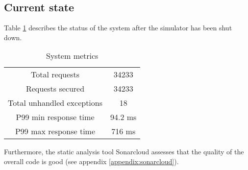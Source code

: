 \subsection{Current state}
Table \ref{current-table} describes the status of the system after the simulator has been shut down.
\begin{table}[H]
    \begin{center}
        \begin{tabular}{ |c|c| }
            \hline
            Total requests & 34233 \\
            Requests secured & 34233 \\
            Total unhandled exceptions & 18 \\
            P99 min response time & 94.2 ms \\
            P99 max response time & 716 ms \\
            \hline
        \end{tabular}
    \end{center}
    \caption{System metrics}
    \label{current-table}
\end{table}
Furthermore, the static analysis tool Sonarcloud assesses that the quality of the overall code is good (see appendix \ref{appendix:sonarcloud}).
